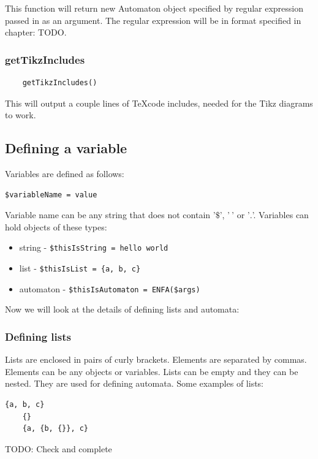 \documentclass{ctuthesis}
\begin{document}
This function will return new Automaton object specified by regular expression passed in as an argument. The regular expression will be in format specified in chapter: TODO.

\subsubsection{getTikzIncludes}
\label{subsec:getTikzIncludes}
\begin{verbatim}
	getTikzIncludes()
\end{verbatim}

This will output a couple lines of \TeX code includes, needed for the Tikz diagrams to work.

\subsection{Defining a variable}
Variables are defined as follows:
\begin{verbatim}
$variableName = value
\end{verbatim}

Variable name can be any string that does not contain '$\$$', '$\ $' or '$.$'. Variables can hold objects of these types:
\begin{itemize}
	\item string - \verb'$thisIsString = hello world'
	\item list - \verb'$thisIsList = {a, b, c}'
	\item automaton - \verb'$thisIsAutomaton = ENFA($args)'
\end{itemize}

Now we will look at the details of defining lists and automata:

\subsubsection{Defining lists}
Lists are enclosed in pairs of curly brackets. Elements are separated by commas. Elements can be any objects or variables. Lists can be empty and they can be nested. They are used for defining automata. Some examples of lists:

\begin{minipage}{\linewidth}
\begin{lstlisting}[language = JASL]
	{a, b, c}
	{}
	{a, {b, {}}, c}
\end{lstlisting}
\end{minipage}
TODO: Check and complete
\end{document}
